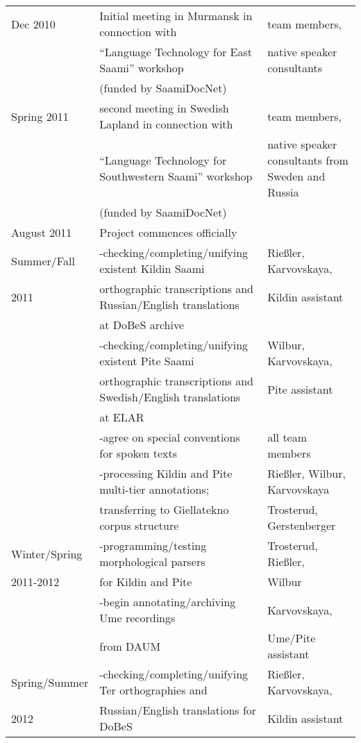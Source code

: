 \documentclass[a4paper,12pt]{article}
\begin{document}
{{{{\begin{longtable}{ l l l }
\hline Dec 2010		& Initial meeting in Murmansk in connection with		& team members,\\
				& “Language Technology for East Saami” workshop		&native speaker consultants\\%
				& (funded by SaamiDocNet) 						& \\
\hline Spring 2011	& second meeting in Swedish Lapland in connection with	& team members,\\
				& “Language Technology for Southwestern Saami” workshop	& native speaker consultants from Sweden and Russia\\
				& (funded by SaamiDocNet)						&\\
\hline August 2011	&Project commences officially						&\\
\hline Summer/Fall	&-checking/completing/unifying existent Kildin Saami		& Rießler, Karvovskaya,\\
	2011			& orthographic transcriptions and Russian/English translations& Kildin assistant\\
				& at DoBeS archive								&\\
				&-checking/completing/unifying existent Pite Saami		& Wilbur, Karvovskaya,\\
				& orthographic transcriptions and Swedish/English translations& Pite assistant\\
				& at ELAR										&\\
				&-agree on special conventions for spoken texts		& all team members\\
				&-processing Kildin and Pite multi-tier annotations;		& Rießler, Wilbur, Karvovskaya\\ %
				&transferring to Giellatekno corpus structure			& Trosterud, Gerstenberger\\
\hline Winter/Spring	&-programming/testing morphological parsers			& Trosterud, Rießler,\\
	2011-2012	&for Kildin and Pite								& Wilbur\\
				&-begin annotating/archiving Ume recordings			& Karvovskaya,\\
				&from DAUM									& Ume/Pite assistant\\
\hline Spring/Summer&-checking/completing/unifying Ter orthographies and	& Rießler, Karvovskaya,\\
	2012			&Russian/English translations for DoBeS				& Kildin assistant\\

\end{longtable}}}}}
\end{document}
